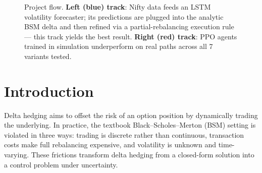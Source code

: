 \documentclass[10pt,a4paper]{article}
\begin{document}
\begin{figure}[H]
\caption{Project flow. \textbf{Left (blue) track}: Nifty data feeds an LSTM
volatility forecaster; its predictions are plugged into the analytic BSM delta
and then refined via a partial-rebalancing execution rule — this track yields
the best result. \textbf{Right (red) track}: PPO agents trained in simulation
underperform on real paths across all 7 variants tested.}
\label{fig:flow}
\end{figure}

\section{Introduction}
Delta hedging aims to offset the risk of an option position by dynamically
trading the underlying. In practice, the textbook Black--Scholes--Merton (BSM)
setting is violated in three ways: trading is discrete rather than continuous,
transaction costs make full rebalancing expensive, and volatility is unknown
and time-varying. These frictions transform delta hedging from a closed-form
solution into a control problem under uncertainty.
\end{document}
